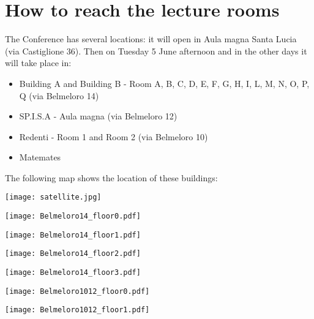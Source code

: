 \section*{How to reach the lecture rooms}
The Conference has several locations: it will open in Aula magna Santa Lucia (via Castiglione 36).
Then on Tuesday 5 June afternoon and in the other days it will take place in:

\bigskip

\begin{itemize}
\item Building A and Building B - Room A, B, C, D, E, F, G, H, I, L, M, N, O, P, Q (via Belmeloro 14)
\item SP.I.S.A - Aula magna (via Belmeloro 12)
\item Redenti - Room 1 and Room 2 (via Belmeloro 10)
\item Matemates
\end{itemize}

\bigskip

\noindent The following map shows the location of these buildings:

\bigskip

\texttt{[image: satellite.jpg]}

\newpage

\texttt{[image: Belmeloro14\_floor0.pdf]}

\vspace{2cm}

\texttt{[image: Belmeloro14\_floor1.pdf]}

\newpage

\texttt{[image: Belmeloro14\_floor2.pdf]}

\vspace{2cm}

\texttt{[image: Belmeloro14\_floor3.pdf]}

\newpage

\texttt{[image: Belmeloro1012\_floor0.pdf]}

\vspace{2cm}

\texttt{[image: Belmeloro1012\_floor1.pdf]}

\newpage

